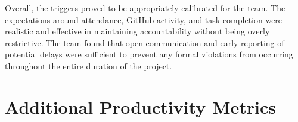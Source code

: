 \documentclass{article}
\begin{document}
Overall, the triggers proved to be appropriately calibrated for the team. The expectations around attendance, GitHub activity, and task completion were realistic and effective in maintaining accountability without being overly restrictive. The team found that open communication and early reporting of potential delays were sufficient to prevent any formal violations from occurring throughout the entire duration of the project.

\section{Additional Productivity Metrics}

\end{document}
